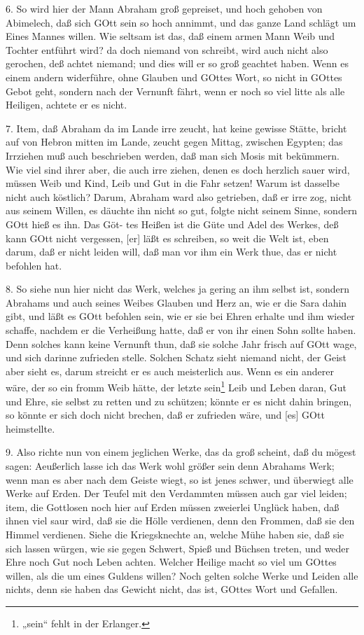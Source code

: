 6. So wird hier der Mann Abraham groß gepreiset, und hoch gehoben von Abimelech, daß sich GOtt sein so hoch annimmt, und das ganze Land schlägt um Eines Mannes willen. Wie seltsam ist das, daß einem armen Mann Weib und Tochter entführt wird? da doch niemand von schreibt, wird auch nicht also gerochen, deß achtet niemand; und dies will er so groß geachtet haben. Wenn es einem andern widerführe, ohne Glauben und GOttes Wort, so nicht in GOttes Gebot geht, sondern nach der Vernunft fährt, wenn er noch so viel litte als alle Heiligen, achtete er es nicht.

7. Item, daß Abraham da im Lande irre zeucht, hat keine gewisse Stätte, bricht auf von Hebron mitten im Lande, zeucht gegen Mittag, zwischen Egypten; das Irrziehen muß auch beschrieben werden, daß man sich Mosis mit bekümmern. Wie viel sind ihrer aber, die auch irre ziehen, denen es doch herzlich sauer wird, müssen Weib und Kind, Leib und Gut in die Fahr setzen! Warum ist dasselbe nicht auch köstlich? Darum, Abraham ward also getrieben, daß er irre zog, nicht aus seinem Willen, es däuchte ihn nicht so gut, folgte nicht seinem Sinne, sondern GOtt hieß es ihn. Das Göt-
tes Heißen ist die Güte und Adel des Werkes, deß kann GOtt nicht vergessen, [er] läßt es schreiben, so weit die Welt ist, eben darum, daß er nicht leiden will, daß man vor ihm ein Werk thue, das er nicht befohlen hat.

8. So siehe nun hier nicht das Werk, welches ja gering an ihm selbst ist, sondern Abrahams und auch seines Weibes Glauben und Herz an, wie er die Sara dahin gibt, und läßt es GOtt befohlen sein, wie er sie bei Ehren erhalte und ihm wieder schaffe, nachdem er die Verheißung hatte, daß er von ihr einen Sohn sollte haben. Denn solches kann keine Vernunft thun, daß sie solche Jahr frisch auf GOtt wage, und sich darinne zufrieden stelle. Solchen Schatz sieht niemand nicht, der Geist aber sieht es, darum streicht er es auch meisterlich aus. Wenn es ein anderer wäre, der so ein fromm Weib hätte, der letzte sein\footnote{„sein“ fehlt in der Erlanger.} Leib und Leben daran, Gut und Ehre, sie selbst zu retten und zu schützen; könnte er es nicht dahin bringen, so könnte er sich doch nicht brechen, daß er zufrieden wäre, und [es] GOtt heimstellte.

9. Also richte nun von einem jeglichen Werke, das da groß scheint, daß du mögest sagen: Aeußerlich lasse ich das Werk wohl größer sein denn Abrahams Werk; wenn man es aber nach dem Geiste wiegt, so ist jenes schwer, und überwiegt alle Werke auf Erden. Der Teufel mit den Verdammten müssen auch gar viel leiden; item, die Gottlosen noch hier auf Erden müssen zweierlei Unglück haben, daß ihnen viel saur wird, daß sie die Hölle verdienen, denn den Frommen, daß sie den Himmel verdienen. Siehe die Kriegsknechte an, welche Mühe haben sie, daß sie sich lassen würgen, wie sie gegen Schwert, Spieß und Büchsen treten, und weder Ehre noch Gut noch Leben achten. Welcher Heilige macht so viel um GOttes willen, als die um eines Guldens willen? Noch gelten solche Werke und Leiden alle nichts, denn sie haben das Gewicht nicht, das ist, GOttes Wort und Gefallen.

